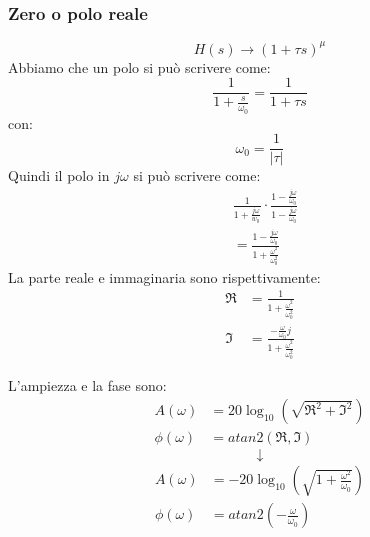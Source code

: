 \documentclass[a4paper]{article}
\begin{document}
\subsubsection{Zero o polo reale}
\[
  H(s) \to \left( 1 + \tau s \right)^{\mu}
\]
\label{09-12-D5}
Abbiamo che un polo si può scrivere come:
\[
\frac{1}{1 + \frac{s}{\omega_0}} = \frac{1}{1 + \tau s}
\] 
con:
\[
\omega_0 = \frac{1}{|\tau|}
\] 
Quindi il polo in \( j \omega \) si può scrivere come:
\[
  \begin{aligned}
    &\frac{1}{1 + \frac{j \omega}{w_0}}\cdot \frac{1 - \frac{j \omega}{\omega_0}}{1 - \frac{j \omega}{\omega_0}}\\
    &= \frac{1 - \frac{j \omega}{\omega_0}}{1 + \frac{\omega^2}{\omega_0^2}}
  \end{aligned}
\] 
La parte reale e immaginaria sono rispettivamente:
\[
\begin{aligned}
  \Re &= \frac{1}{1 + \frac{\omega^2}{\omega_0^2}}\\
  \Im &= \frac{-\frac{\omega}{\omega_0}j}{1 + \frac{\omega^2}{\omega_0^2}}
\end{aligned}
\] 

\begin{definition}
  L'ampiezza e la fase sono:
  \[
    \begin{aligned}
      A(\omega) &= 20 \log_{10} \left( \sqrt{\Re^2 + \Im^2} \right)\\
      \phi(\omega) &= atan2\left( \Re, \Im \right)
    \end{aligned}
  \] 
  \[
    \downarrow
  \] 
  \[
    \begin{aligned}
      A(\omega) &= -20 \log_{10} \left( \sqrt{1 + \frac{\omega^2}{\omega_0}} \right)\\
      \phi(\omega) &= atan2\left( -\frac{\omega}{\omega_0} \right)
    \end{aligned}
  \] 
\end{definition}
\end{document}
